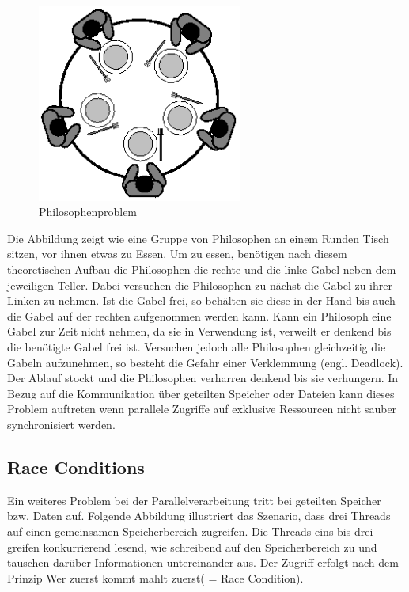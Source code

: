 \documentclass[12pt,oneside,a4paper,bibtotoc,liststotoc]{scrreprt}
\begin{document}
\begin{figure}[H]
  \begin{centering}
    \includegraphics[width=0.6\textwidth]{img/PhilosophenProblem.png}
    \caption{Philosophenproblem \cite[vgl. ]{002}}
    \label{Philosophenproblem}
  \end{centering}
\end{figure}
Die Abbildung zeigt wie eine Gruppe von Philosophen an einem Runden Tisch sitzen, vor ihnen etwas zu Essen. Um zu essen, benötigen nach diesem theoretischen Aufbau die Philosophen die rechte und die linke Gabel neben dem jeweiligen Teller. Dabei versuchen die Philosophen zu nächst die Gabel zu ihrer Linken zu nehmen. Ist die Gabel frei, so behälten sie diese in der Hand bis auch die Gabel auf der rechten aufgenommen werden kann. Kann ein Philosoph eine Gabel zur Zeit nicht nehmen, da sie in Verwendung ist, verweilt er denkend bis die benötigte Gabel frei ist. Versuchen jedoch alle Philosophen gleichzeitig die Gabeln aufzunehmen, so besteht die Gefahr einer Verklemmung (engl. Deadlock). Der Ablauf stockt und die Philosophen verharren denkend bis sie verhungern. In Bezug auf die Kommunikation über geteilten Speicher oder Dateien kann dieses Problem auftreten wenn parallele Zugriffe auf exklusive Ressourcen nicht sauber synchronisiert werden.



\subsection{Race Conditions}
Ein weiteres Problem bei der Parallelverarbeitung tritt bei geteilten Speicher bzw. Daten auf. Folgende Abbildung illustriert das Szenario, dass drei Threads auf einen gemeinsamen Speicherbereich zugreifen. Die Threads eins bis drei greifen konkurrierend lesend, wie schreibend auf den Speicherbereich zu und tauschen darüber Informationen untereinander aus. Der Zugriff erfolgt nach dem Prinzip \glqq Wer zuerst kommt mahlt zuerst\grqq  ( = Race Condition).
\end{document}
